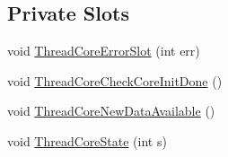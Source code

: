 \subsection*{Private Slots}
\begin{DoxyCompactItemize}
\item 
void \hyperlink{classCCore_a8da26ce21ea70fb3c31978e6d2fce17e}{ThreadCoreErrorSlot} (int err)
\item 
void \hyperlink{classCCore_a201541672b99640948959c4022f8cda4}{ThreadCoreCheckCoreInitDone} ()
\item 
void \hyperlink{classCCore_a05760021352ea7bdb7304d7d0f2a61eb}{ThreadCoreNewDataAvailable} ()
\item 
void \hyperlink{classCCore_a6b1594d8d1a21121d0db95c5e9a8fabd}{ThreadCoreState} (int s)
\end{DoxyCompactItemize}
